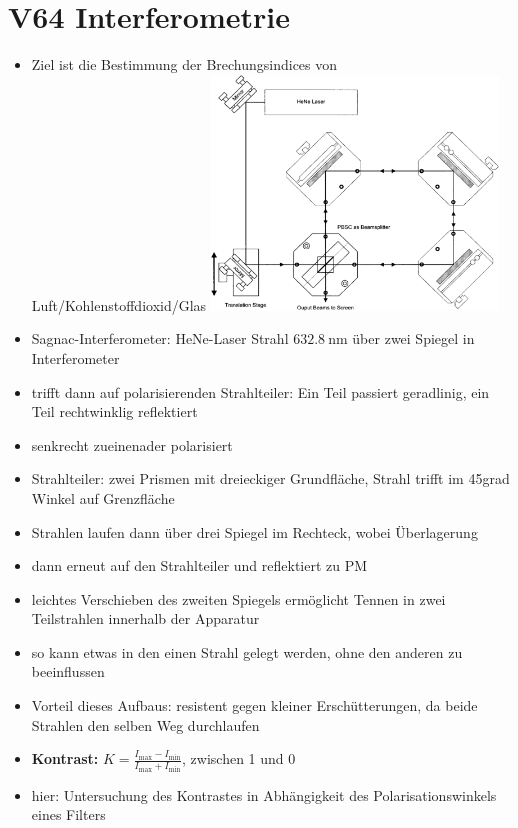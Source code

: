\section{V64 Interferometrie}
\label{sec:V64}

\begin{itemize}
    \item Ziel ist die Bestimmung der Brechungsindices von Luft/Kohlenstoffdioxid/Glas
        \includegraphics[width=0.6\textwidth]{figures/sagnac.pdf}
    \item Sagnac-Interferometer: HeNe-Laser Strahl $\SI{632,8}{\nano\meter}$ über zwei Spiegel in Interferometer
    \item trifft dann auf polarisierenden Strahlteiler: Ein Teil passiert geradlinig, ein Teil rechtwinklig reflektiert
    \item senkrecht zueinenader polarisiert
    \item Strahlteiler: zwei Prismen mit dreieckiger Grundfläche, Strahl trifft im 45grad Winkel auf Grenzfläche
    \item Strahlen laufen dann über drei Spiegel im Rechteck, wobei Überlagerung
    \item dann erneut auf den Strahlteiler und reflektiert zu PM
    \item leichtes Verschieben des zweiten Spiegels ermöglicht Tennen in zwei Teilstrahlen innerhalb der Apparatur
    \item so kann etwas in den einen Strahl gelegt werden, ohne den anderen zu beeinflussen
    \item Vorteil dieses Aufbaus: resistent gegen kleiner Erschütterungen, da beide Strahlen den selben Weg durchlaufen
    \item \textbf{Kontrast:} $K=\frac{I_\text{max}-I_\text{min}}{I_\text{max}+I_\text{min}}$, zwischen 1 und 0
    \item hier: Untersuchung des Kontrastes in Abhängigkeit des Polarisationswinkels eines Filters

\end{itemize}
